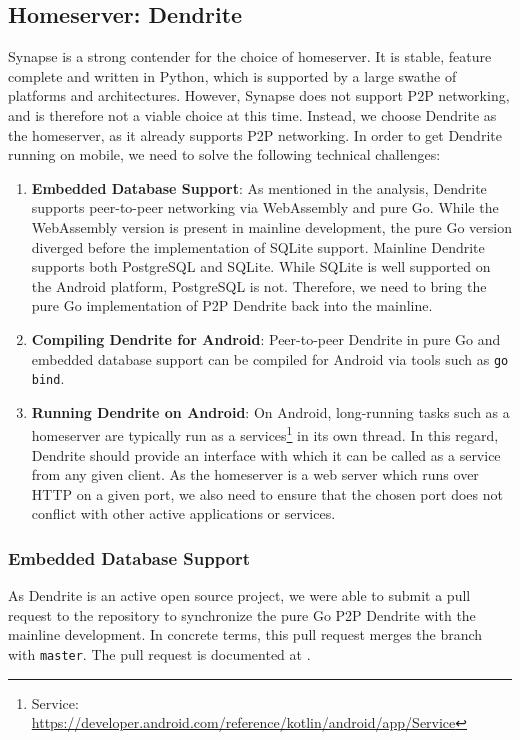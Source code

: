 \subsection{Homeserver: Dendrite}
Synapse is a strong contender for the choice of homeserver.
It is stable, feature complete and written in Python, which is supported by a large swathe of platforms and architectures.
However, Synapse does not support \ac{P2P} networking, and is therefore not a viable choice at this time.
Instead, we choose Dendrite as the homeserver, as it already supports \ac{P2P} networking.
In order to get Dendrite running on mobile, we need to solve the following technical challenges:
\begin{enumerate}
    \item{
          \textbf{Embedded Database Support}:
          As mentioned in the analysis, Dendrite supports peer-to-peer networking via WebAssembly and pure Go.
          While the WebAssembly version is present in mainline development, the pure Go version diverged before the implementation of SQLite support.
          Mainline Dendrite supports both PostgreSQL and SQLite.
          While SQLite is well supported on the Android platform, PostgreSQL is not.
          Therefore, we need to bring the pure Go implementation of P2P Dendrite back into the mainline.
          }
    \item{
          \textbf{Compiling Dendrite for Android}:
          Peer-to-peer Dendrite in pure Go and embedded database support can be compiled for Android via tools such as \texttt{go bind}.
          }
    \item{
          \textbf{Running Dendrite on Android}:
          On Android, long-running tasks such as a homeserver are typically run as a services\footnote{Service: \url{https://developer.android.com/reference/kotlin/android/app/Service}} in its own thread.
          In this regard, Dendrite should provide an interface with which it can be called as a service from any given client.
          As the homeserver is a web server which runs over HTTP on a given port, we also need to ensure that the chosen port does not conflict with other active applications or services.
          }
\end{enumerate}


\subsubsection{Embedded Database Support}
As Dendrite is an active open source project, we were able to submit a pull request to the repository to synchronize the pure Go P2P Dendrite with the mainline development.
In concrete terms, this pull request merges the  branch with \texttt{master}.
The pull request is documented at .

